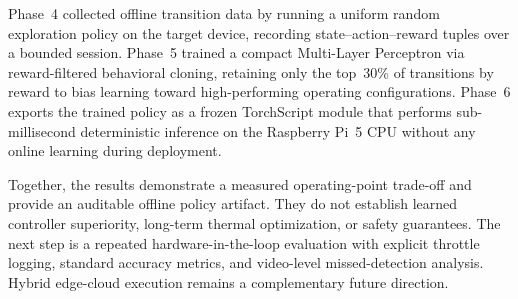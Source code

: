 \documentclass{ieeeaccess}
\begin{document}
Phase~4 collected offline transition data by running a uniform random
exploration policy on the target device, recording state--action--reward
tuples over a bounded session. Phase~5 trained a compact
Multi-Layer Perceptron via reward-filtered behavioral cloning, retaining
only the top~30\% of transitions by reward to bias learning toward
high-performing operating configurations. Phase~6 exports the trained
policy as a frozen TorchScript module that performs sub-millisecond
deterministic inference on the Raspberry Pi~5 CPU without any online
learning during deployment.

\begin{highlight}
Together, the results demonstrate a measured operating-point trade-off and
provide an auditable offline policy artifact. They do not establish learned
controller superiority, long-term thermal optimization, or safety guarantees.
The next step is a repeated hardware-in-the-loop evaluation with explicit
throttle logging, standard accuracy metrics, and video-level missed-detection
analysis. Hybrid edge-cloud execution remains a complementary future
direction.
\end{highlight}
\end{document}
